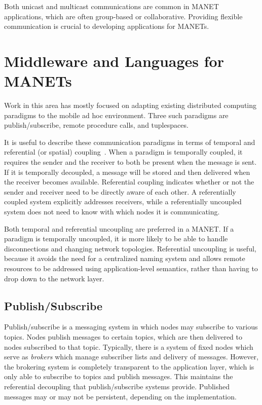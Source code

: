 Both unicast and multicast communications are common in MANET applications, which are often group-based or collaborative. Providing flexible communication is crucial to developing applications for MANETs.

\section{Middleware and Languages for MANETs}

Work in this area has mostly focused on adapting existing distributed computing paradigms to the mobile ad hoc environment. Three such paradigms are publish/subscribe, remote procedure calls, and tuplespaces.

It is useful to describe these communication paradigms in terms of temporal and referential (or spatial) coupling~\cite{distbook}. When a paradigm is temporally coupled, it requires the sender and the receiver to both be present when the message is sent. If it is temporally decoupled, a message will be stored and then delivered when the receiver becomes available. Referential coupling indicates whether or not the sender and receiver need to be directly aware of each other. A referentially coupled system explicitly addresses receivers, while a referentially uncoupled system does not need to know with which nodes it is communicating. 

Both temporal and referential uncoupling are preferred in a MANET. If a paradigm is temporally uncoupled, it is more likely to be able to handle disconnections and changing network topologies. Referential uncoupling is useful, because it avoids the need for a centralized naming system and allows remote resources to be addressed using application-level semantics, rather than having to drop down to the network layer.

\subsection{Publish/Subscribe}

Publish/subscribe is a messaging system in which nodes may subscribe to various topics. Nodes publish messages to certain topics, which are then delivered to nodes subscribed to that topic. Typically, there is a system of fixed nodes which serve as \textit{brokers} which manage subscriber lists and delivery of messages. However, the brokering system is completely transparent to the application layer, which is only able to subscribe to topics and publish messages. This maintains the referential decoupling that publish/subscribe systems provide. Published messages may or may not be persistent, depending on the implementation.

